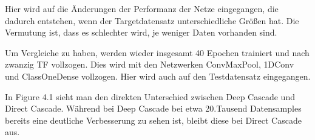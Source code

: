 Hier wird auf die Änderungen der Performanz der Netze eingegangen, die dadurch entstehen, wenn der Targetdatensatz unterschiedliche Größen hat. 
Die Vermutung ist, dass es schlechter wird, je weniger Daten vorhanden sind. 

Um Vergleiche zu haben, werden wieder insgesamt 40 Epochen trainiert und nach zwanzig TF vollzogen. Dies wird mit den Netzwerken 
ConvMaxPool, 1DConv und ClassOneDense vollzogen. Hier wird auch auf den Testdatensatz eingegangen. 

In Figure 4.1 sieht man den direkten Unterschied zwischen Deep Cascade und Direct Cascade. Während bei Deep Cascade bei etwa 20.Tausend 
Datensamples bereits eine deutliche Verbesserung zu sehen ist, bleibt diese bei Direct Cascade aus. 

\iffalse
\begin{figure}[htpb]
    \texttt{[image: ../../Plots/ba\_plots/targetgroesse/1.VL/cmp\_ts.png]}
    \texttt{[image: ../../Plots/ba\_plots/targetgroesse/2.L/cmp\_ts.png]}
    \texttt{[image: ../../Plots/ba\_plots/targetgroesse/1.VL/cod\_ts.png]}
    \texttt{[image: ../../Plots/ba\_plots/targetgroesse/2.L/cod\_ts.png]}
    \caption{\label{fig:vl2l} Vergleich zwischen Deep und Direct Cascade}
\end{figure}
\fi

